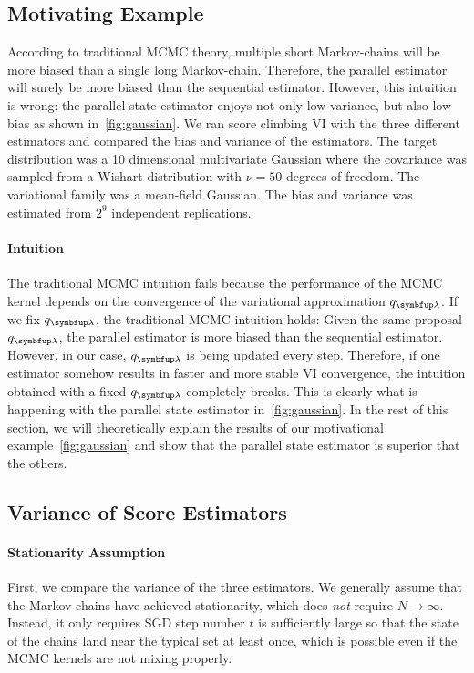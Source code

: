 \subsection{Motivating Example}\label{section:motivation}
\vspace{-0.05in}
According to traditional MCMC theory, multiple short Markov-chains will be more biased than a single long Markov-chain.
Therefore, the parallel estimator will surely be more biased than the sequential estimator.
However, this intuition is wrong: the parallel state estimator enjoys not only low variance, but also low bias as shown in~\cref{fig:gaussian}.
We ran score climbing VI with the three different estimators and compared the bias and variance of the estimators.
The target distribution was a 10 dimensional multivariate Gaussian where the covariance was sampled from a Wishart distribution with \(\nu = 50\) degrees of freedom.
The variational family was a mean-field Gaussian.
The bias and variance was estimated from \(2^9\) independent replications.

\vspace{-0.05in}
\paragraph{Intuition}
The traditional MCMC intuition fails because the performance of the MCMC kernel depends on the convergence of the variational approximation \(q_{\vlambda}\).
If we fix \(q_{\vlambda}\), the traditional MCMC intuition holds:
Given the same proposal \(q_{\vlambda}\), the parallel estimator is more biased than the sequential estimator.
However, in our case, \(q_{\vlambda}\) is being updated every step.
Therefore, if one estimator somehow results in faster and more stable VI convergence, the intuition obtained with a fixed \(q_{\vlambda}\) completely breaks.
This is clearly what is happening with the parallel state estimator in~\cref{fig:gaussian}.
In the rest of this section, we will theoretically explain the results of our motivational example~\cref{fig:gaussian} and show that the parallel state estimator is superior that the others.

\vspace{-0.05in}
\subsection{Variance of Score Estimators}\label{section:var}
\paragraph{Stationarity Assumption}
First, we compare the variance of the three estimators.
We generally assume that the Markov-chains have achieved stationarity, which does \textit{not} require \(N \rightarrow \infty\).
Instead, it only requires SGD step number \(t\) is sufficiently large so that the state of the chains land near the typical set at least once, which is possible even if the MCMC kernels are not mixing properly.

